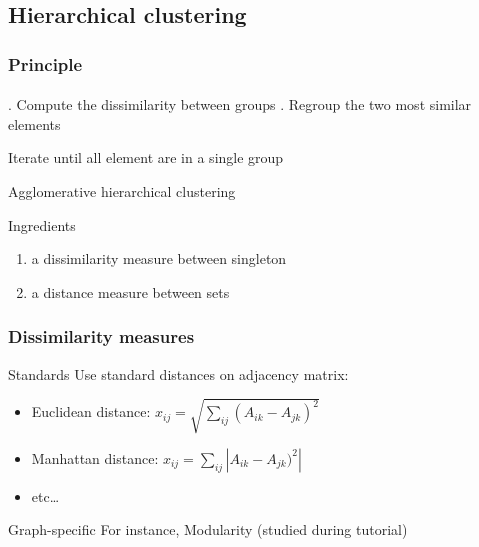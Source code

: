 \documentclass{beamer}\usepackage[]{graphicx}\usepackage[]{color}
\begin{document}
\subsection{Hierarchical clustering}

\begin{frame}
  \frametitle{Principle}
  \framesubtitle{}


  \begin{algorithm}[H]
    \BlankLine\BlankLine
    . Compute the dissimilarity between groups . Regroup the two most similar elements \;
      
      Iterate until all element are in a single group \;
    \BlankLine\BlankLine

    \caption{Agglomerative hierarchical clustering}
  \end{algorithm}
  
  \begin{block}{Ingredients}
    \begin{enumerate}
      \item a dissimilarity measure between singleton
      \item a distance measure between sets
    \end{enumerate}
  \end{block}

\end{frame}

\begin{frame}
  \frametitle{Dissimilarity measures}

  \begin{block}{Standards}
    Use standard distances on adjacency matrix:
    \begin{itemize}
      \item Euclidean distance: $\displaystyle x_{ij} = \sqrt{\sum_{ij} (A_{ik} - A_{jk})^2} $
      \item Manhattan distance: $\displaystyle x_{ij} = \sum_{ij} |A_{ik} - A_{jk})^2| $
      \item  etc\dots
    \end{itemize}  
  \end{block}

  \vfill

  \begin{block}{Graph-specific}
    For instance,  Modularity (studied during tutorial)
  \end{block}
  
\end{frame}
\end{document}
